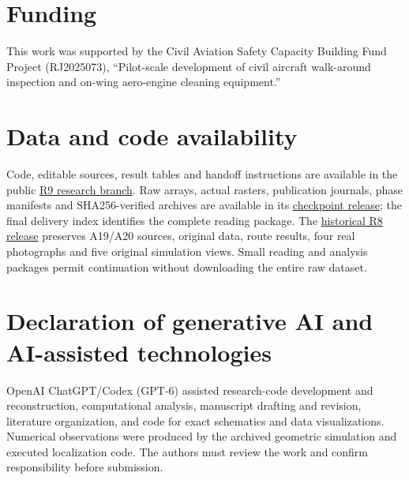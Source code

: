 \documentclass[final,3p,times]{elsarticle}
\begin{document}
\section*{Funding}
This work was supported by the Civil Aviation Safety Capacity Building Fund Project (RJ2025073), ``Pilot-scale development of civil aircraft walk-around inspection and on-wing aero-engine cleaning equipment.''
\section*{Data and code availability}
Code, editable sources, result tables and handoff instructions are available in the public \href{https://github.com/edrisskrah131-lang/A20-AEI-R8/tree/r9-rebuild-20261012}{R9 research branch}. Raw arrays, actual rasters, publication journals, phase manifests and SHA256-verified archives are available in its \href{https://github.com/edrisskrah131-lang/A20-AEI-R8/releases/tag/r9-checkpoints-20261012}{checkpoint release}; the final delivery index identifies the complete reading package. The \href{https://github.com/edrisskrah131-lang/A20-AEI-R8/releases/tag/r8-handoff-2026-10-12}{historical R8 release} preserves A19/A20 sources, original data, route results, four real photographs and five original simulation views. Small reading and analysis packages permit continuation without downloading the entire raw dataset.
\section*{Declaration of generative AI and AI-assisted technologies}
OpenAI ChatGPT/Codex (GPT-6) assisted research-code development and reconstruction, computational analysis, manuscript drafting and revision, literature organization, and code for exact schematics and data visualizations. Numerical observations were produced by the archived geometric simulation and executed localization code. The authors must review the work and confirm responsibility before submission.


\FloatBarrier
\end{document}
